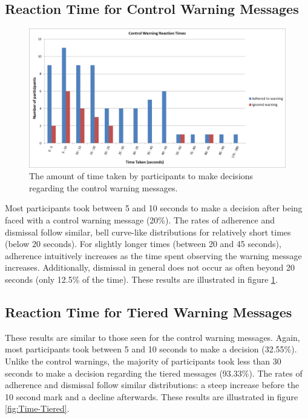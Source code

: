\subsection{Reaction Time for Control Warning Messages}
\begin{figure}[!htb]
	\centering
	\includegraphics[width=\textwidth]{Figures/Time-Control}
	\decoRule
	\caption[Control warning decision times]{The amount of time taken by participants to make decisions regarding the control warning messages.}
	\label{fig:Time-Control}
\end{figure}
Most participants took between 5 and 10 seconds to make a decision after being faced with a control warning message (20\%). The rates of adherence and dismissal follow similar, bell curve-like distributions for relatively short times (below 20 seconds). For slightly longer times (between 20 and 45 seconds), adherence intuitively increases as the time spent observing the warning message increases. Additionally, dismissal in general does not occur as often beyond 20 seconds (only 12.5\% of the time). These results are illustrated in figure \ref{fig:Time-Control}.

\subsection{Reaction Time for Tiered Warning Messages}
These results are similar to those seen for the control warning messages. Again, most participants took between 5 and 10 seconds to make a decision (32.55\%). Unlike the control warnings, the majority of participants took less than 30 seconds to make a decision regarding the tiered messages (93.33\%). The rates of adherence and dismissal follow similar distributions: a steep increase before the 10 second mark and a decline afterwards. These results are illustrated in figure \ref{fig:Time-Tiered}.

